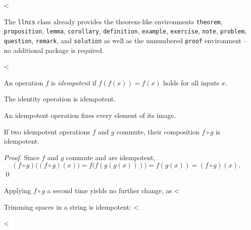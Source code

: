 <%

The \texttt{llncs} class already provides the theorem-like environments \texttt{theorem}, \texttt{proposition}, \texttt{lemma}, \texttt{corollary}, \texttt{definition}, \texttt{example}, \texttt{exercise}, \texttt{note}, \texttt{problem}, \texttt{question}, \texttt{remark}, and \texttt{solution} as well as the unnumbered \texttt{proof} environment -- no additional package is required.

<%
\begin{definition}[Idempotence]
  An operation $f$ is \emph{idempotent} if $f(f(x)) = f(x)$ holds for all inputs $x$.
\end{definition}

\begin{proposition}
  The identity operation is idempotent.
\end{proposition}

\begin{lemma}\label{lem:fixed}
  An idempotent operation fixes every element of its image.
\end{lemma}

\begin{theorem}\label{thm:idempotent-composition}
  If two idempotent operations $f$ and $g$ commute, their composition $f \circ g$ is idempotent.
\end{theorem}

\begin{proof}
  Since $f$ and $g$ commute and are idempotent,
  \begin{equation}
    (f \circ g)\bigl((f \circ g)(x)\bigr) = f\bigl(f(g(g(x)))\bigr) = f(g(x)) = (f \circ g)(x).
    \label{eq:idempotent-composition}
  \end{equation}
  \qed
\end{proof}

\begin{corollary}
  Applying $f \circ g$ a second time yields no further change, as <%
\end{corollary}

\begin{example}
  Trimming spaces in a string is idempotent: <%
\end{example}
<%

